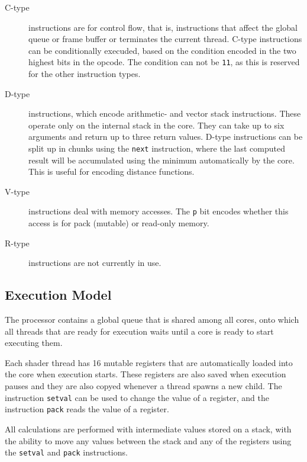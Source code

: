 			\begin{description}
				\item[C-type] instructions are for control flow, that is, 
					instructions that affect the global queue or frame buffer or
					terminates the current thread. C-type instructions can be 
					conditionally execuded, based on the condition encoded in
					the two highest bits in the opcode. The condition can not
					be \texttt{11}, as this is reserved for the other 
					instruction types.

				\item[D-type] instructions, which encode arithmetic- and vector
					stack instructions. These operate only on the internal stack
					in the core. They can take up to six arguments and return up
					to three return values. D-type instructions can be split up 
					in chunks using the \texttt{next} instruction, where the 
					last computed result will be accumulated using the minimum
					automatically by the core. This is useful for encoding 
					distance functions.
					
				\item[V-type] instructions deal with memory accesses. The
					\texttt{p} bit encodes whether this access is for pack
					(mutable) or read-only memory.

				\item[R-type] instructions are not currently in use.
			\end{description}
		
		\subsection{Execution Model}

			The processor contains a global queue that is shared among all
			cores, onto which all threads that are ready for execution waits
			until a core is ready to start executing them.
			
			Each shader thread has 16 mutable registers that are automatically
			loaded into the core when execution starts. These registers are
			also saved when execution pauses and they are also copyed whenever
			a thread spawns a new child. The instruction \texttt{setval} can be
			used to change the value of a register, and the instruction
			\texttt{pack} reads the value of a register.
	
			All calculations are performed with intermediate values stored on a
			stack, with the ability to move any values between the stack and
			any of the registers using the \texttt{setval} and \texttt{pack}
			instructions.
	
